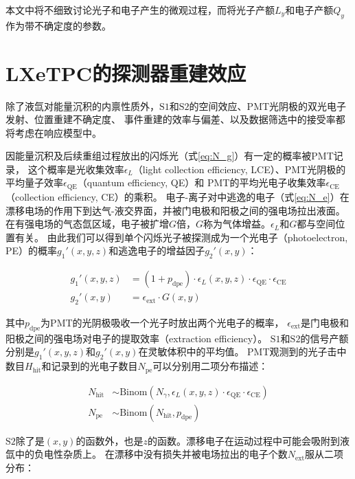 本文中将不细致讨论光子和电子产生的微观过程，而将光子产额$L_y$和电子产额$Q_y$作为带不确定度的参数。

\section{LXeTPC的探测器重建效应}

除了液氙对能量沉积的内禀性质外，$\mathrm{S1}$和$\mathrm{S2}$的空间效应、PMT光阴极的双光电子发射、位置重建不确定度、
事件重建的效率与偏差、以及数据筛选中的接受率都将考虑在响应模型中。

因能量沉积及后续重组过程放出的闪烁光（式\ref{eq:N_g}）有一定的概率被PMT记录，
这个概率是光收集效率$\epsilon_L$（light collection efficiency, LCE）、PMT光阴极的平均量子效率$\epsilon_{\mathrm{QE}}$（quantum efficiency, QE）和
PMT的平均光电子收集效率$\epsilon_{\mathrm{CE}}$（collection efficiency, CE）的乘积。
电子-离子对中逃逸的电子（式\ref{eq:N_e}）在漂移电场的作用下到达气-液交界面，并被门电极和阳极之间的强电场拉出液面。
在有强电场的气态氙区域，电子被扩增$G$倍，$G$称为气体增益。$\epsilon_L$和$G$都与空间位置有关。
由此我们可以得到单个闪烁光子被探测成为一个光电子（photoelectron, PE）的概率$g_1'(x,y,z)$和逃逸电子的增益因子$g_2'(x,y)$：

\begin{align}
    \label{eq:g12p}
    g_1'(x,y,z) &= (1+p_{\mathrm{dpe}})\cdot\epsilon_L(x,y,z)\cdot\epsilon_{\mathrm{QE}}\cdot\epsilon_{\mathrm{CE}} \\
    g_2'(x,y) &= \epsilon_{\mathrm{ext}}\cdot G(x,y)
\end{align}

其中$p_{\mathrm{dpe}}$为PMT的光阴极吸收一个光子时放出两个光电子的概率\cite{arazi_first_2015,paredes_response_2018}，
$\epsilon_{\mathrm{ext}}$是门电极和阳极之间的强电场对电子的提取效率（extraction efficiency）。
$\mathrm{S1}$和$\mathrm{S2}$的信号产额分别是$g_1'(x,y,z)$和$g_2'(x,y)$在灵敏体积中的平均值。
PMT观测到的光子击中数目$H_{\mathrm{hit}}$和记录到的光电子数目$N_{\mathrm{pe}}$可以分别用二项分布描述：

\begin{align}
    \label{eq:N_hitpe}
    N_{\mathrm{hit}} &\sim \mathrm{Binom}\left(N_\gamma,\epsilon_L(x,y,z)\cdot\epsilon_{\mathrm{QE}}\cdot\epsilon_{\mathrm{CE}}\right) \\
    N_{\mathrm{pe}} &\sim \mathrm{Binom}\left(N_{\mathrm{hit}},p_{\mathrm{dpe}}\right)
\end{align}

$\mathrm{S2}$除了是$(x,y)$的函数外，也是$z$的函数。漂移电子在运动过程中可能会吸附到液氙中的负电性杂质上。
在漂移中没有损失并被电场拉出的电子个数$N_{\mathrm{ext}}$服从二项分布：


